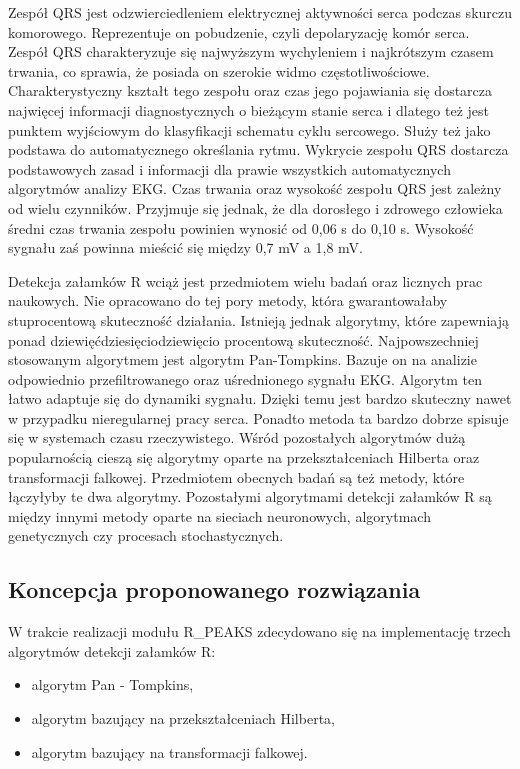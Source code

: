 Zespół QRS jest odzwierciedleniem elektrycznej aktywności serca podczas skurczu komorowego. Reprezentuje on pobudzenie, czyli depolaryzację komór serca. Zespół QRS charakteryzuje się najwyższym wychyleniem i najkrótszym czasem trwania, co sprawia, że posiada on szerokie widmo częstotliwościowe. Charakterystyczny kształt tego zespołu oraz czas jego pojawiania się dostarcza najwięcej informacji diagnostycznych o bieżącym stanie serca i dlatego też jest punktem wyjściowym do klasyfikacji schematu cyklu sercowego. Służy też jako podstawa do automatycznego określania rytmu. Wykrycie zespołu QRS dostarcza podstawowych zasad i informacji dla prawie wszystkich automatycznych algorytmów analizy EKG. Czas trwania oraz wysokość zespołu QRS jest zależny od wielu czynników. Przyjmuje się jednak, że dla dorosłego i zdrowego człowieka średni czas trwania zespołu powinien wynosić od 0,06 s do 0,10 s. Wysokość sygnału zaś powinna mieścić się między 0,7 mV a 1,8 mV.

Detekcja załamków R wciąż jest przedmiotem wielu badań oraz licznych prac naukowych. Nie opracowano do tej pory metody, która gwarantowałaby stuprocentową skuteczność działania. Istnieją jednak algorytmy, które zapewniają ponad dziewięćdziesięciodziewięcio procentową skuteczność. Najpowszechniej stosowanym algorytmem jest algorytm Pan-Tompkins. Bazuje on na analizie odpowiednio przefiltrowanego oraz uśrednionego sygnału EKG. Algorytm ten łatwo adaptuje się do dynamiki sygnału. Dzięki temu jest bardzo skuteczny nawet w przypadku nieregularnej pracy serca. Ponadto metoda ta bardzo dobrze spisuje się w systemach czasu rzeczywistego. Wśród pozostałych algorytmów dużą popularnością cieszą się algorytmy oparte na przekształceniach Hilberta oraz transformacji falkowej. Przedmiotem obecnych badań są też metody, które łączyłyby te dwa algorytmy. Pozostałymi algorytmami detekcji załamków R są między innymi metody oparte na sieciach neuronowych, algorytmach genetycznych czy procesach stochastycznych.
\subsection{Koncepcja proponowanego rozwiązania}

W trakcie realizacji modułu R\_PEAKS zdecydowano się na implementację trzech algorytmów detekcji załamków R:
\begin{itemize}
\item algorytm Pan - Tompkins,
\item algorytm bazujący na przekształceniach Hilberta,
\item algorytm bazujący na transformacji falkowej.
\end{itemize}
